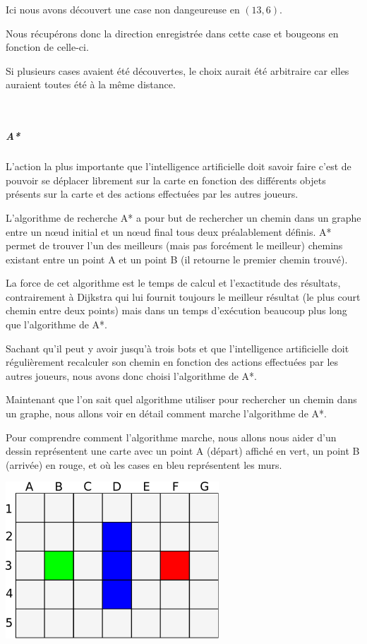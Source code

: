 			Ici nous avons découvert une case non dangeureuse en $(13,6)$.
			
			Nous récupérons donc la direction enregistrée dans cette case et bougeons en fonction de celle-ci.
			
			Si plusieurs cases avaient été découvertes, le choix aurait été arbitraire car elles auraient toutes été à la même distance.
			
			$\,$
			
		\subparagraph{A*\\}
		
			L'action la plus importante que l'intelligence artificielle doit savoir faire c'est de pouvoir se déplacer librement sur la carte en fonction des différents objets présents sur la carte et des actions effectuées par les autres joueurs.
		
			L'algorithme de recherche A* a pour but de rechercher un chemin
			dans un graphe entre un nœud initial et un nœud final tous deux préalablement
			définis. A* permet de trouver l'un des meilleurs (mais pas forcément le
			meilleur) chemins existant entre un point A et un point B (il retourne le premier chemin trouvé).
			
			La force de cet algorithme est le temps de calcul et l'exactitude des résultats, contrairement à Dijkstra qui lui fournit toujours le meilleur résultat (le plus court chemin entre deux points) mais dans un temps d'exécution beaucoup plus long que l'algorithme de A*.
			
			Sachant qu'il peut y avoir jusqu'à trois \glspl{bot} et que l'intelligence artificielle doit régulièrement recalculer son chemin en fonction des actions effectuées par les autres joueurs, nous avons donc choisi l'algorithme de A*.
		
			Maintenant que l'on sait quel algorithme utiliser pour rechercher un chemin dans un graphe, nous allons voir en détail comment marche l'algorithme de A*.
		
			Pour comprendre comment l'algorithme marche, nous allons nous aider d'un
			dessin représentent une carte avec un point A (départ) affiché en vert, un
			point B (arrivée) en rouge, et où les cases en bleu représentent les murs.
		
			\begin{center}
				\includegraphics[width=8cm]{./Analyse/Img/Grille.eps}
			\end{center}
		
